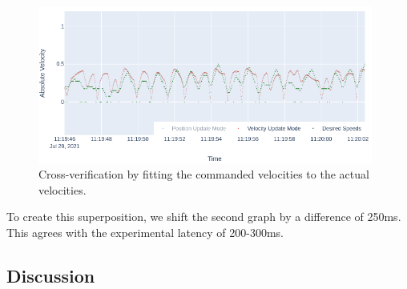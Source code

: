 \begin{figure}[!h]
    \raggedright
    \includegraphics[width=11cm]{images/hdi_graphs/velocity_adapted.png}

    \caption{Cross-verification by fitting the commanded velocities to the actual velocities.}
    \label{fig:response_shift}
\end{figure}

To create this superposition, we shift the second graph by a difference of 250ms. This agrees with the experimental latency of 200-300ms.  

\pagebreak
\subsection{Discussion}





